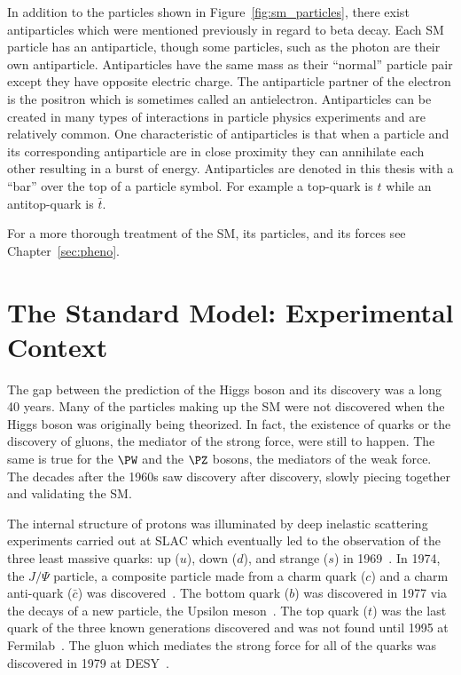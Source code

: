 In addition to the particles shown in Figure~\ref{fig:sm_particles}, there exist antiparticles
which were mentioned previously in regard to beta decay.
Each SM particle has an antiparticle, though some particles, such as the photon
are their own antiparticle. Antiparticles have the same mass as their
``normal'' particle pair except they have opposite electric charge. The antiparticle
partner of the electron is the positron which is sometimes called an antielectron.
Antiparticles can be created in many types of interactions in particle physics experiments
and are relatively common. One characteristic of antiparticles is that when a particle and its 
corresponding antiparticle are in close proximity they can annihilate each other resulting in
a burst of energy.
Antiparticles are denoted in this thesis with a ``bar'' over the top of a particle symbol. For example
a top-quark is $t$ while an antitop-quark is $\bar{t}$.

For a more thorough treatment of the SM, its particles, and its forces see
Chapter~\ref{sec:pheno}.



\section{The Standard Model: Experimental Context}
The gap between the prediction of the Higgs boson and its discovery was a long 40 years.
Many of the particles making up the SM were not discovered when the Higgs boson
was originally being theorized. In fact, the existence of quarks or the discovery 
of gluons, the mediator of the strong force, were still to happen. The same is true
for the $\PW$ and the $\PZ$ bosons, the mediators of the weak force. The decades after the
1960s saw discovery after discovery, slowly piecing together and validating
the SM.

The internal structure of protons was illuminated by
deep inelastic scattering experiments carried out at SLAC which eventually led to 
the observation of the three least massive quarks: up ($u$), down ($d$), and strange ($s$)
in 1969~\cite{PhysRevLett.23.930,Breidenbach:1969kd}. In 1974, the $J/\Psi$ particle, a composite 
particle made from a charm quark ($c$) and a charm anti-quark ($\bar{c}$) was 
discovered~\cite{PhysRevLett.33.1404,PhysRevLett.33.1406}. 
The bottom quark ($b$) was discovered in 1977 via the decays of a new particle, the Upsilon
meson~\cite{PhysRevLett.39.252}. The top quark ($t$) was the last quark of the three
known generations discovered
and was not found until 1995 at Fermilab~\cite{PhysRevLett.74.2626,PhysRevLett.74.2632}.
The gluon which mediates the strong force for all of the quarks was discovered in 
1979 at DESY~\cite{PhysRevLett.43.830}.

